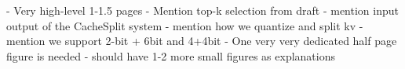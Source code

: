 - Very high-level 1-1.5 pages
- Mention top-k selection from draft
- mention input output of the CacheSplit system
- mention how we quantize and split kv
- mention we support 2-bit + 6bit and 4+4bit
- One very very dedicated half page figure is needed
- should have 1-2 more small figures as explanations
